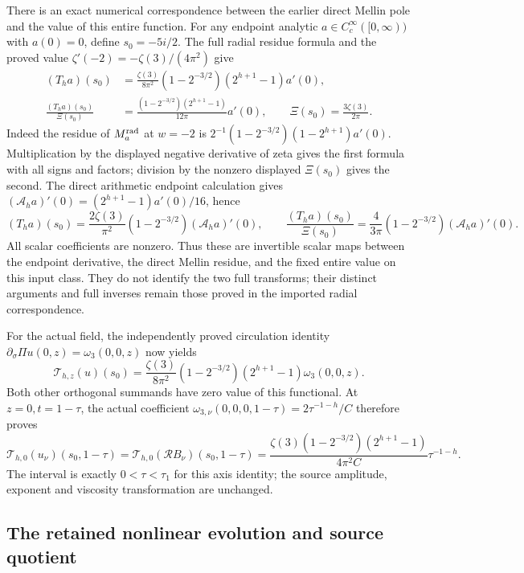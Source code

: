 There is an exact numerical correspondence between the earlier direct
Mellin pole and the value of this entire function. For any endpoint
analytic \(a\in C_c^\infty([0,\infty))\) with \(a(0)=0\), define
\(s_0=-5i/2\). The full radial residue formula and the proved value
\(\zeta'(-2)=-\zeta(3)/(4\pi^2)\) give
\begin{align*}
 (T_ha)(s_0)
 &=\frac{\zeta(3)}{8\pi^2}
       (1-2^{-3/2})(2^{h+1}-1)a'(0),\\
 \frac{(T_ha)(s_0)}{\Xi(s_0)}
 &=\frac{(1-2^{-3/2})(2^{h+1}-1)}{12\pi}a'(0),
 \qquad \Xi(s_0)=\frac{3\zeta(3)}{2\pi}.
\end{align*}
Indeed the residue of \(M_a^{\rm rad}\) at \(w=-2\) is
\(2^{-1}(1-2^{-3/2})(1-2^{h+1})a'(0)\). Multiplication by the
displayed negative derivative of zeta gives the first formula with all
signs and factors; division by the nonzero displayed \(\Xi(s_0)\)
gives the second. The direct arithmetic endpoint calculation gives
\((\mathcal A_ha)'(0)=(2^{h+1}-1)a'(0)/16\), hence
\[
 (T_ha)(s_0)=\frac{2\zeta(3)}{\pi^2}(1-2^{-3/2})
                    (\mathcal A_ha)'(0),
 \qquad
 \frac{(T_ha)(s_0)}{\Xi(s_0)}
   =\frac4{3\pi}(1-2^{-3/2})(\mathcal A_ha)'(0).
\]
All scalar coefficients are nonzero. Thus these are invertible scalar
maps between the endpoint derivative, the direct Mellin residue, and the
fixed entire value on this input class. They do not identify the two
full transforms; their distinct arguments and full inverses remain
those proved in the imported radial correspondence.

For the actual field, the independently proved circulation identity
\(\partial_\sigma\Pi u(0,z)=\omega_3(0,0,z)\) now yields
\[
 \mathcal T_{h,z}(u)(s_0)
 =\frac{\zeta(3)}{8\pi^2}(1-2^{-3/2})(2^{h+1}-1)
                          \omega_3(0,0,z).
\]
Both other orthogonal summands have zero value of this functional.
At \(z=0,t=1-\tau\), the actual coefficient
\(\omega_{3,\nu}(0,0,0,1-\tau)=2\tau^{-1-h}/C\) therefore proves
\[
 \mathcal T_{h,0}(u_\nu)(s_0,1-\tau)
 =\mathcal T_{h,0}(\mathcal R B_\nu)(s_0,1-\tau)
 =\frac{\zeta(3)(1-2^{-3/2})(2^{h+1}-1)}{4\pi^2C}
                                                   \tau^{-1-h}.
\]
The interval is exactly \(0<\tau<\tau_1\) for this axis identity;
the source amplitude, exponent and viscosity transformation are unchanged.

\subsection*{The retained nonlinear evolution and source quotient}

